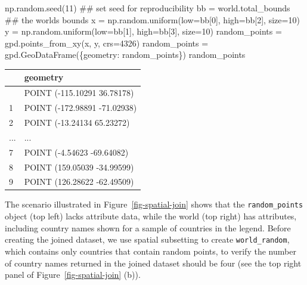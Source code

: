 \documentclass[
  letterpaper,
]{krantz}
\newenvironment{Shaded}{\begin{snugshade}}{\end{snugshade}}
\newcommand{\CommentTok}[1]{\textcolor[rgb]{0.37,0.37,0.37}{#1}}
\newcommand{\DecValTok}[1]{\textcolor[rgb]{0.68,0.00,0.00}{#1}}
\newcommand{\NormalTok}[1]{\textcolor[rgb]{0.00,0.23,0.31}{#1}}
\newcommand{\OperatorTok}[1]{\textcolor[rgb]{0.37,0.37,0.37}{#1}}
\newcommand{\StringTok}[1]{\textcolor[rgb]{0.13,0.47,0.30}{#1}}
\begin{document}
\begin{Shaded}
\begin{Highlighting}[]
\NormalTok{np.random.seed(}\DecValTok{11}\NormalTok{)       }\CommentTok{\#\# set seed for reproducibility}
\NormalTok{bb }\OperatorTok{=}\NormalTok{ world.total\_bounds  }\CommentTok{\#\# the world\textquotesingle{}s bounds}
\NormalTok{x }\OperatorTok{=}\NormalTok{ np.random.uniform(low}\OperatorTok{=}\NormalTok{bb[}\DecValTok{0}\NormalTok{], high}\OperatorTok{=}\NormalTok{bb[}\DecValTok{2}\NormalTok{], size}\OperatorTok{=}\DecValTok{10}\NormalTok{)}
\NormalTok{y }\OperatorTok{=}\NormalTok{ np.random.uniform(low}\OperatorTok{=}\NormalTok{bb[}\DecValTok{1}\NormalTok{], high}\OperatorTok{=}\NormalTok{bb[}\DecValTok{3}\NormalTok{], size}\OperatorTok{=}\DecValTok{10}\NormalTok{)}
\NormalTok{random\_points }\OperatorTok{=}\NormalTok{ gpd.points\_from\_xy(x, y, crs}\OperatorTok{=}\DecValTok{4326}\NormalTok{)}
\NormalTok{random\_points }\OperatorTok{=}\NormalTok{ gpd.GeoDataFrame(\{}\StringTok{\textquotesingle{}geometry\textquotesingle{}}\NormalTok{: random\_points\})}
\NormalTok{random\_points}
\end{Highlighting}
\end{Shaded}

\begin{longtable}[]{@{}ll@{}}
\toprule\noalign{}
& geometry \\
\midrule\noalign{}
\endhead
\bottomrule\noalign{}
\endlastfoot
0 & POINT (-115.10291 36.78178) \\
1 & POINT (-172.98891 -71.02938) \\
2 & POINT (-13.24134 65.23272) \\
... & ... \\
7 & POINT (-4.54623 -69.64082) \\
8 & POINT (159.05039 -34.99599) \\
9 & POINT (126.28622 -62.49509) \\
\end{longtable}

The scenario illustrated in Figure~\ref{fig-spatial-join} shows that the
\texttt{random\_points} object (top left) lacks attribute data, while
the world (top right) has attributes, including country names shown for
a sample of countries in the legend. Before creating the joined dataset,
we use spatial subsetting to create \texttt{world\_random}, which
contains only countries that contain random points, to verify the number
of country names returned in the joined dataset should be four (see the
top right panel of Figure~\ref{fig-spatial-join} (b)).
\end{document}
